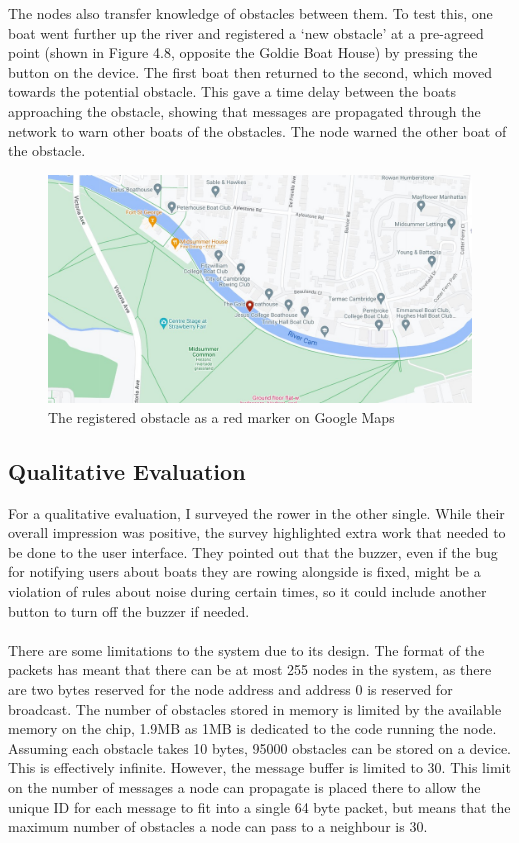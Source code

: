 \documentclass[12pt,a4paper]{report}
\begin{document}
{The nodes also transfer knowledge of obstacles between them. To test this, one boat went further up the river and registered a `new obstacle' at a pre-agreed point (shown in Figure 4.8, opposite the Goldie Boat House) by pressing the button on the device. The first boat then returned to the second, which moved towards the potential obstacle. This gave a time delay between the boats approaching the obstacle, showing that messages are propagated through the network to warn other boats of the obstacles. The node warned the other boat of the obstacle. 
\begin{figure}[h]
\begin{center}
\includegraphics[scale=0.3]{obstacle.jpg}
\end{center}
\caption{The registered obstacle as a red marker on Google Maps \cite{googlemapsgeneral}}
\end{figure}


\subsection{Qualitative Evaluation}
For a qualitative evaluation, I surveyed the rower in the other single. While their overall impression was positive, the survey highlighted extra work that needed to be done to the user interface. They pointed out that the buzzer, even if the bug for notifying users about boats they are rowing alongside is fixed, might be a violation of rules about noise during certain times, so it could include another button to turn off the buzzer if needed. \\ \\ 
There are some limitations to the system due to its design. The format of the packets has meant that there can be at most 255 nodes in the system, as there are two bytes reserved for the node address and address 0 is reserved for broadcast. The number of obstacles stored in memory is limited by the available memory on the chip, 1.9MB as 1MB is dedicated to the code running the node. Assuming each obstacle takes 10 bytes, 95000 obstacles can be stored on a device. This is effectively infinite. However, the message buffer is limited to 30. This limit on the number of messages a node can propagate is placed there to allow the unique ID for each message to fit into a single 64 byte packet, but means that the maximum number of obstacles a node can pass to a neighbour is 30.

}
\end{document}
